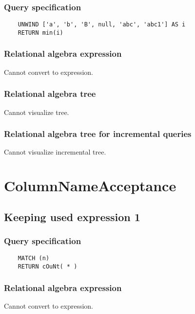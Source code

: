 	\subsubsection*{Query specification}

	\begin{lstlisting}
	UNWIND ['a', 'b', 'B', null, 'abc', 'abc1'] AS i
	RETURN min(i)
	\end{lstlisting}


	\subsubsection*{Relational algebra expression}

	Cannot convert to expression.

	\subsubsection*{Relational algebra tree}

	Cannot visualize tree.

	\subsubsection*{Relational algebra tree for incremental queries}

	Cannot visualize incremental tree.

	\section{ColumnNameAcceptance}

	\subsection{Keeping used expression 1}

	\subsubsection*{Query specification}

	\begin{lstlisting}
	MATCH (n)
	RETURN cOuNt( * )
	\end{lstlisting}


	\subsubsection*{Relational algebra expression}

	Cannot convert to expression.

